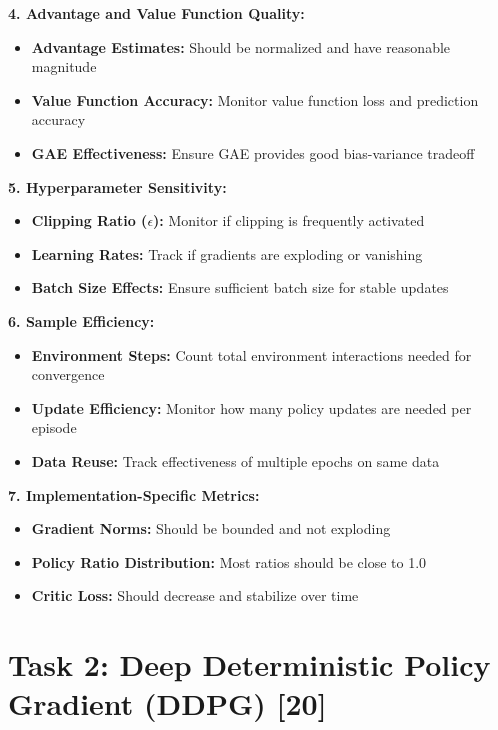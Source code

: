 \documentclass[12pt]{article}
\begin{document}
{{{\textbf{4. Advantage and Value Function Quality:}
\begin{itemize}
    \item \textbf{Advantage Estimates:} Should be normalized and have reasonable magnitude
    \item \textbf{Value Function Accuracy:} Monitor value function loss and prediction accuracy
    \item \textbf{GAE Effectiveness:} Ensure GAE provides good bias-variance tradeoff
\end{itemize}

\textbf{5. Hyperparameter Sensitivity:}
\begin{itemize}
    \item \textbf{Clipping Ratio ($\epsilon$):} Monitor if clipping is frequently activated
    \item \textbf{Learning Rates:} Track if gradients are exploding or vanishing
    \item \textbf{Batch Size Effects:} Ensure sufficient batch size for stable updates
\end{itemize}

\textbf{6. Sample Efficiency:}
\begin{itemize}
    \item \textbf{Environment Steps:} Count total environment interactions needed for convergence
    \item \textbf{Update Efficiency:} Monitor how many policy updates are needed per episode
    \item \textbf{Data Reuse:} Track effectiveness of multiple epochs on same data
\end{itemize}

\textbf{7. Implementation-Specific Metrics:}
\begin{itemize}
    \item \textbf{Gradient Norms:} Should be bounded and not exploding
    \item \textbf{Policy Ratio Distribution:} Most ratios should be close to 1.0
    \item \textbf{Critic Loss:} Should decrease and stabilize over time
\end{itemize}



\newpage

\section{Task 2: Deep Deterministic Policy Gradient (DDPG) [20]}

}}}
\end{document}
